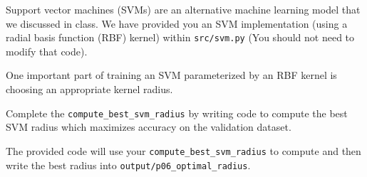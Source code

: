 \item {}
Support vector machines (SVMs) are an alternative machine learning model that we discussed in class.
We have provided you an SVM implementation (using a radial basis function (RBF) kernel) within \texttt{src/svm.py} (You should not need to modify that code).

One important part of training an SVM parameterized by an RBF kernel is choosing an appropriate kernel radius.

Complete the \texttt{compute\_best\_svm\_radius} by writing code to compute the best SVM radius which maximizes accuracy on the validation dataset.

The provided code will use your \texttt{compute\_best\_svm\_radius} to compute and then write the best radius into \texttt{output/p06\_optimal\_radius}.

\ifnum{} {
  
} \fi

